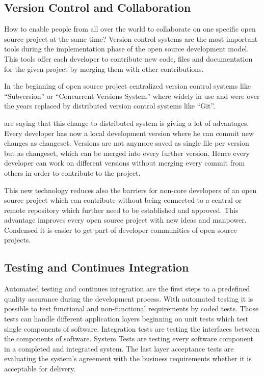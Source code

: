 \documentclass[DIV=calc,paper=a4,fontsize=9pt,twocolumn]{scrartcl}
\begin{document}
\subsection{Version Control and Collaboration}

How to enable people from all over the world to collaborate on one specific open source project at the same time? Version control systems are the most important tools during the implementation phase of the open source development model. This tools offer each developer to contribute new code, files and documentation for the given project by merging them with other contributions. 

In the beginning of open source project centralized version control systems like \enquote{Subversion} or \enquote{Concurrent Versions System} where widely in use and were over the years replaced by distributed version control systems like \enquote{Git}. 

\citet{rodriguez2012distributed} are saying that this change to distributed system is giving a lot of advantages. Every developer has now a local development version where he can commit new changes as changeset. Versions are not anymore saved as single file per version but as changeset, which can be merged into every further version. Hence every developer can work on different versions without merging every commit from others in order to contribute to the project.

This new technology reduces also the barriers for non-core developers of an open source project which can contribute without being connected to a central or remote repository which further need to be established and approved. This advantage improves every open source project with new ideas and manpower. Condensed it is easier to get part of developer communities of open source projects. \citep{rodriguez2012distributed}

\subsection{Testing and Continues Integration}

Automated testing and continues integration are the first steps to a predefined quality assurance during the development process. With automated testing it is possible to test functional and non-functional requirements by coded tests. Those tests can handle different application layers beginning on unit tests which test single components of software. Integration tests are testing the interfaces between the components of software. System Tests are testing every software component in a completed and integrated system. The last layer acceptance tests are evaluating the system's agreement with the business requirements whether it is acceptable for delivery. \citep{abran2001guide}
\end{document}
